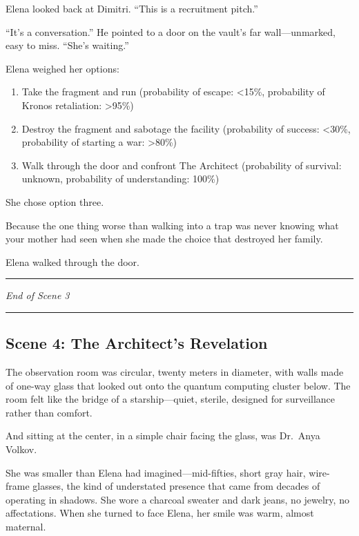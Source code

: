 Elena looked back at Dimitri. ``This is a recruitment pitch.''

``It's a conversation.'' He pointed to a door on the vault's far wall---unmarked, easy to miss. ``She's waiting.''

Elena weighed her options:

\begin{enumerate}
\def\labelenumi{\arabic{enumi}.}
\tightlist
\item
  Take the fragment and run (probability of escape: \textless15\%, probability of Kronos retaliation: \textgreater95\%)
\item
  Destroy the fragment and sabotage the facility (probability of success: \textless30\%, probability of starting a war: \textgreater80\%)
\item
  Walk through the door and confront The Architect (probability of survival: unknown, probability of understanding: 100\%)
\end{enumerate}

She chose option three.

Because the one thing worse than walking into a trap was never knowing what your mother had seen when she made the choice that destroyed her family.

Elena walked through the door.

\begin{center}\rule{0.5\linewidth}{0.5pt}\end{center}

\emph{End of Scene 3}

\begin{center}\rule{0.5\linewidth}{0.5pt}\end{center}

\hypertarget{scene-4-the-architects-revelation}{%
\subsection{Scene 4: The Architect's Revelation}\label{scene-4-the-architects-revelation}}

The observation room was circular, twenty meters in diameter, with walls made of one-way glass that looked out onto the quantum computing cluster below. The room felt like the bridge of a starship---quiet, sterile, designed for surveillance rather than comfort.

And sitting at the center, in a simple chair facing the glass, was Dr.~Anya Volkov.

She was smaller than Elena had imagined---mid-fifties, short gray hair, wire-frame glasses, the kind of understated presence that came from decades of operating in shadows. She wore a charcoal sweater and dark jeans, no jewelry, no affectations. When she turned to face Elena, her smile was warm, almost maternal.

